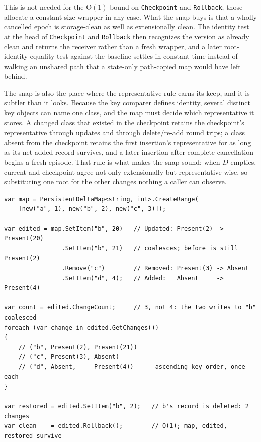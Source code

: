 \documentclass[11pt,twoside,openright]{book}
\newcommand{\code}[1]{\texorpdfstring{\textcolor{d7ink}{\texttt{#1}}}{#1}}
\newcommand{\bigoh}[1]{$\mathrm{O}(#1)$}
\begin{document}
This is not needed for the \bigoh{1} bound on \code{Checkpoint} and
\code{Rollback}; those allocate a constant-size wrapper in any case. What the
snap buys is that a wholly cancelled epoch is storage-clean as well as
extensionally clean. The identity test at the head of \code{Checkpoint} and
\code{Rollback} then recognizes the version as already clean and returns the
receiver rather than a fresh wrapper, and a later root-identity equality test
against the baseline settles in constant time instead of walking an unshared
path that a state-only path-copied map would have left behind.

The snap is also the place where the representative rule earns its keep, and it
is subtler than it looks. Because the key comparer defines identity, several
distinct key objects can name one class, and the map must decide which
representative it stores. A changed class that existed in the checkpoint retains
the checkpoint's representative through updates and through delete/re-add round
trips; a class absent from the checkpoint retains the first insertion's
representative for as long as its net-added record survives, and a later
insertion after complete cancellation begins a fresh episode. That rule is what
makes the snap sound: when $D$ empties, current and checkpoint agree not only
extensionally but representative-wise, so substituting one root for the other
changes nothing a caller can observe.

\begin{lstlisting}[language={[Sharp]C}]
var map = PersistentDeltaMap<string, int>.CreateRange(
    [new("a", 1), new("b", 2), new("c", 3)]);

var edited = map.SetItem("b", 20)   // Updated: Present(2) -> Present(20)
                .SetItem("b", 21)   // coalesces; before is still Present(2)
                .Remove("c")        // Removed: Present(3) -> Absent
                .SetItem("d", 4);   // Added:   Absent     -> Present(4)

var count = edited.ChangeCount;     // 3, not 4: the two writes to "b" coalesced
foreach (var change in edited.GetChanges())
{
    // ("b", Present(2), Present(21))
    // ("c", Present(3), Absent)
    // ("d", Absent,     Present(4))   -- ascending key order, once each
}

var restored = edited.SetItem("b", 2);   // b's record is deleted: 2 changes
var clean    = edited.Rollback();        // O(1); map, edited, restored survive
\end{lstlisting}
\end{document}
